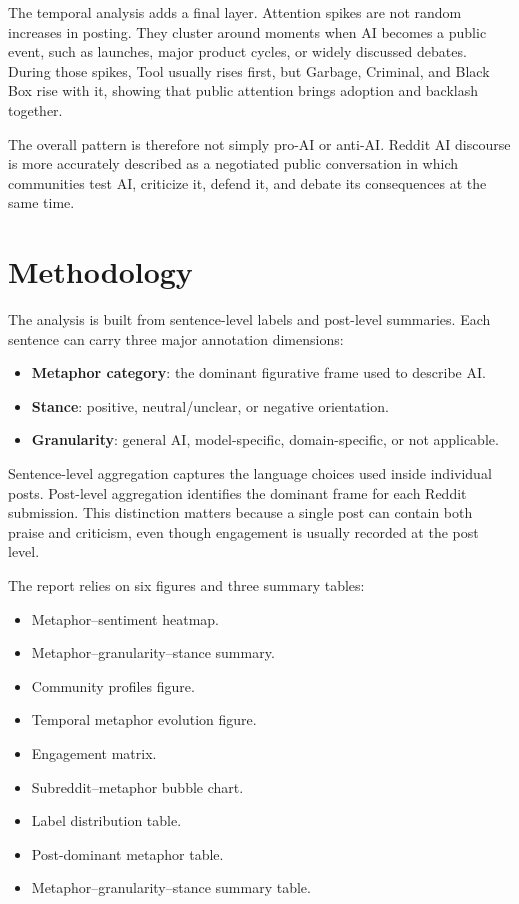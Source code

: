\documentclass[11pt]{article}
\begin{document}
The temporal analysis adds a final layer. Attention spikes are not random increases in posting. They cluster around moments when AI becomes a public event, such as launches, major product cycles, or widely discussed debates. During those spikes, Tool usually rises first, but Garbage, Criminal, and Black Box rise with it, showing that public attention brings adoption and backlash together.

The overall pattern is therefore not simply pro-AI or anti-AI. Reddit AI discourse is more accurately described as a negotiated public conversation in which communities test AI, criticize it, defend it, and debate its consequences at the same time.

\section{Methodology}
The analysis is built from sentence-level labels and post-level summaries. Each sentence can carry three major annotation dimensions:
\begin{itemize}
  \item \textbf{Metaphor category}: the dominant figurative frame used to describe AI.
  \item \textbf{Stance}: positive, neutral/unclear, or negative orientation.
  \item \textbf{Granularity}: general AI, model-specific, domain-specific, or not applicable.
\end{itemize}

Sentence-level aggregation captures the language choices used inside individual posts. Post-level aggregation identifies the dominant frame for each Reddit submission. This distinction matters because a single post can contain both praise and criticism, even though engagement is usually recorded at the post level.

The report relies on six figures and three summary tables:
\begin{itemize}
  \item Metaphor--sentiment heatmap.
  \item Metaphor--granularity--stance summary.
  \item Community profiles figure.
  \item Temporal metaphor evolution figure.
  \item Engagement matrix.
  \item Subreddit--metaphor bubble chart.
  \item Label distribution table.
  \item Post-dominant metaphor table.
  \item Metaphor--granularity--stance summary table.
\end{itemize}
\end{document}
